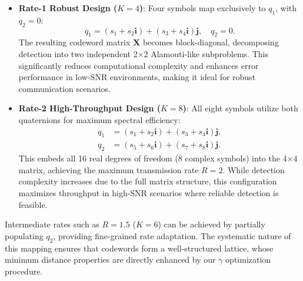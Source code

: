 \begin{itemize}
    \item \textbf{Rate-1 Robust Design ($K=4$)}: Four symbols map exclusively to $q_1$, with $q_2 = 0$:
    \begin{equation}
    q_1 = (s_1 + s_2 \mathbf{i}) + (s_3 + s_4 \mathbf{i}) \mathbf{j}, \quad q_2 = 0.
    \end{equation}
    The resulting codeword matrix $\mathbf{X}$ becomes block-diagonal, decomposing detection into two independent 2×2 Alamouti-like subproblems. This significantly reduces computational complexity and enhances error performance in low-SNR environments, making it ideal for robust communication scenarios.

    \item \textbf{Rate-2 High-Throughput Design ($K=8$)}: All eight symbols utilize both quaternions for maximum spectral efficiency:
    \begin{align}
        q_1 &= (s_1 + s_2 \mathbf{i}) + (s_3 + s_4 \mathbf{i}) \mathbf{j}, \\
        q_2 &= (s_5 + s_6 \mathbf{i}) + (s_7 + s_8 \mathbf{i}) \mathbf{j}.
    \end{align}
    This embeds all 16 real degrees of freedom (8 complex symbols) into the 4×4 matrix, achieving the maximum transmission rate $R=2$. While detection complexity increases due to the full matrix structure, this configuration maximizes throughput in high-SNR scenarios where reliable detection is feasible.
\end{itemize}

Intermediate rates such as $R=1.5$ ($K=6$) can be achieved by partially populating $q_2$, providing fine-grained rate adaptation. The systematic nature of this mapping ensures that codewords form a well-structured lattice, whose minimum distance properties are directly enhanced by our $\gamma$ optimization procedure.
